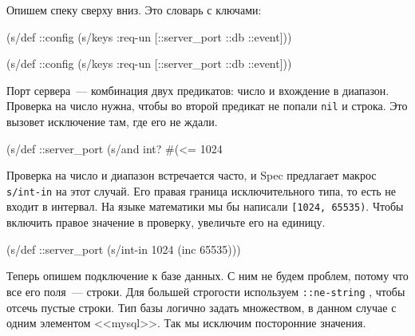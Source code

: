 \noindent
Опишем спеку сверху вниз. Это словарь с ключами:

\ifx\DEVICETYPE\MOBILE

\begin{english}
  \begin{clojure}
(s/def ::config
  (s/keys :req-un [::server_port
                   ::db ::event]))
  \end{clojure}
\end{english}

\else

\begin{english}
  \begin{clojure}
(s/def ::config
  (s/keys :req-un [::server_port ::db ::event]))
  \end{clojure}
\end{english}

\fi


Порт сервера~--- комбинация двух предикатов: число и вхождение в диапазон.
Проверка на число нужна, чтобы во второй предикат не попали \verb|nil| и
строка. Это вызовет исключение там, где его не ждали.

\begin{english}
  \begin{clojure}
(s/def ::server_port
  (s/and int? #(<= 1024 %
  \end{clojure}
\end{english}


Проверка на число и диапазон встречается часто, и Spec предлагает макрос
\verb|s/int-in| на этот случай. Его правая граница исключительного типа, то есть
не входит в интервал. На языке математики мы бы написали \verb|[1024, 65535)|.
Чтобы включить правое значение в проверку, увеличьте его на единицу.

\begin{english}
  \begin{clojure}
(s/def ::server_port
  (s/int-in 1024 (inc 65535)))
  \end{clojure}
\end{english}


Теперь опишем подключение к базе данных. С ним не будем проблем, потому что все
его поля~--- строки. Для большей строгости используем \verb|::ne-string| ,
чтобы отсечь пустые строки. Тип базы логично задать множеством, в данном
случае с одним элементом <<mysql>>. Так мы исключим посторонние значения.


